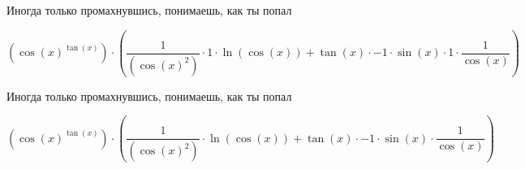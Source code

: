 \documentclass[a4paper,12pt]{article}
\begin{document}
\begin{center}
Иногда только промахнувшись, понимаешь, как ты попал
\end{center}


\begin{center}
\begin{equation}
(\cos(x)^{\tan(x)}) \cdot ( \frac{1 }{ (\cos(x)^{2}) }  \cdot 1 \cdot \ln(\cos(x)) + \tan(x) \cdot -1 \cdot \sin(x) \cdot 1 \cdot  \frac{1 }{ \cos(x) } )
\end{equation}
\end{center}

\begin{center}
Иногда только промахнувшись, понимаешь, как ты попал
\end{center}


\begin{center}
\begin{equation}
(\cos(x)^{\tan(x)}) \cdot ( \frac{1 }{ (\cos(x)^{2}) }  \cdot \ln(\cos(x)) + \tan(x) \cdot -1 \cdot \sin(x) \cdot  \frac{1 }{ \cos(x) } )
\end{equation}
\end{center}
\end{document}
